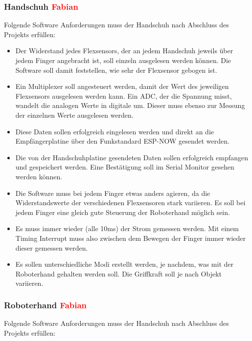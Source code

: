 \documentclass[11pt]{article}
\begin{document}
\subsubsection{Handschuh \textcolor{red}{Fabian}}
Folgende Software Anforderungen muss der Handschuh nach Abschluss des Projekts erfüllen:
\begin{itemize}
	\item Der Widerstand jedes Flexsensors, der an jedem Handschuh jeweils über jedem Finger angebracht ist, soll einzeln 
	ausgelesen werden können. Die Software soll damit feststellen, wie sehr der Flexsensor gebogen ist.
	\item Ein Multiplexer soll angesteuert werden, damit der Wert des jeweiligen Flexsensors ausgelesen werden kann. 
	Ein ADC, der die Spannung misst, wandelt die analogen Werte in digitale um. Dieser muss ebenso zur Messung der einzelnen 
	Werte ausgelesen werden.
	\item Diese Daten sollen erfolgreich eingelesen werden und direkt an die Empfängerplatine über den Funkstandard ESP-NOW 
	gesendet werden.
	\item Die von der Handschuhplatine gesendeten Daten sollen erfolgreich empfangen und gespeichert werden. Eine Bestätigung 
	soll im Serial Monitor gesehen werden können.
	\item Die Software muss bei jedem Finger etwas anders agieren, da die Widerstandswerte der verschiedenen Flexsensoren stark 
	variieren. Es soll bei jedem Finger eine gleich gute Steuerung der Roboterhand möglich sein.
	\item Es muss immer wieder (alle 10ms) der Strom gemessen werden. Mit einem Timing Interrupt muss also zwischen dem Bewegen 
	der Finger immer wieder dieser gemessen werden.
	\item Es sollen unterschiedliche Modi erstellt werden, je nachdem, was mit der Roboterhand gehalten werden soll. Die 
	Griffkraft soll je nach Objekt variieren.
\end{itemize}

\subsubsection{Roboterhand \textcolor{red}{Fabian}}
Folgende Software Anforderungen muss der Handschuh nach Abschluss des Projekts erfüllen:
\end{document}
